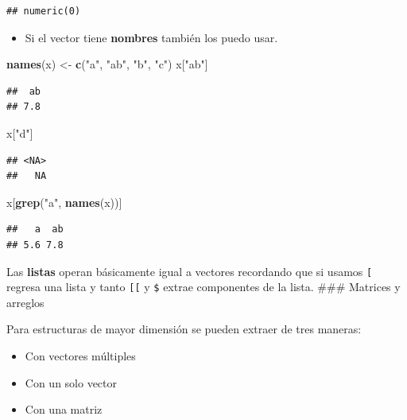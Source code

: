 \documentclass[]{article}
\newenvironment{Shaded}{\begin{snugshade}}{\end{snugshade}}
\newcommand{\KeywordTok}[1]{\textcolor[rgb]{0.13,0.29,0.53}{\textbf{{#1}}}}
\newcommand{\StringTok}[1]{\textcolor[rgb]{0.31,0.60,0.02}{{#1}}}
\newcommand{\NormalTok}[1]{{#1}}
\begin{document}
\begin{verbatim}
## numeric(0)
\end{verbatim}

\begin{itemize}
\itemsep1pt\parskip0pt
\item
  Si el vector tiene \textbf{nombres} también los puedo usar.
\end{itemize}

\begin{Shaded}
\begin{Highlighting}[]
\KeywordTok{names}\NormalTok{(x) <-}\StringTok{ }\KeywordTok{c}\NormalTok{(}\StringTok{"a"}\NormalTok{, }\StringTok{"ab"}\NormalTok{, }\StringTok{"b"}\NormalTok{, }\StringTok{"c"}\NormalTok{)}
\NormalTok{x[}\StringTok{"ab"}\NormalTok{]}
\end{Highlighting}
\end{Shaded}

\begin{verbatim}
##  ab 
## 7.8
\end{verbatim}

\begin{Shaded}
\begin{Highlighting}[]
\NormalTok{x[}\StringTok{"d"}\NormalTok{]}
\end{Highlighting}
\end{Shaded}

\begin{verbatim}
## <NA> 
##   NA
\end{verbatim}

\begin{Shaded}
\begin{Highlighting}[]
\NormalTok{x[}\KeywordTok{grep}\NormalTok{(}\StringTok{"a"}\NormalTok{, }\KeywordTok{names}\NormalTok{(x))]}
\end{Highlighting}
\end{Shaded}

\begin{verbatim}
##   a  ab 
## 5.6 7.8
\end{verbatim}

Las \textbf{listas} operan básicamente igual a vectores recordando que
si usamos \texttt{{[}} regresa una lista y tanto \texttt{{[}{[}} y
\texttt{\$} extrae componentes de la lista. \#\#\# Matrices y arreglos

Para estructuras de mayor dimensión se pueden extraer de tres maneras:

\begin{itemize}
\itemsep1pt\parskip0pt
\item
  Con vectores múltiples
\item
  Con un solo vector
\item
  Con una matriz
\end{itemize}
\end{document}
